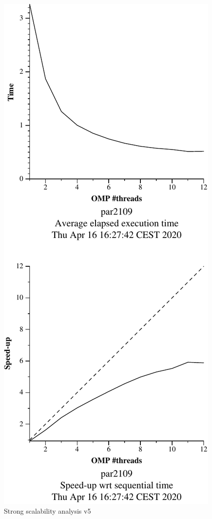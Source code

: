 \begin{figure}[H]
    \begin{minipage}{0.5\textwidth}
        \centering
        \includegraphics[width=0.7\linewidth]{plots/v5-crop.pdf}
        \caption{Strong scalability analysis v5}
        \label{fig:ssa_v5} 
    \end{minipage}
    \begin{minipage}{0.5\textwidth}
        \centering

\end{minipage}
\end{figure}
